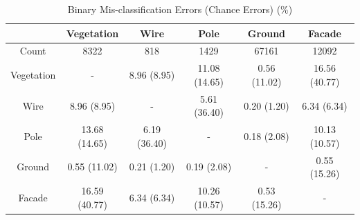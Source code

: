 \documentclass{article}
\begin{document}
\begin{table}
	\centering
	\caption{Binary Mis-classification Errors (Chance Errors) (\%)} 
	\begin{tabular}{cccccc}\toprule
		&Vegetation&Wire&Pole&Ground&Facade\\ \midrule
		Count & 8322 & 818 & 1429 & 67161 & 12092 \\ \midrule
		Vegetation & - & 8.96 (8.95) & 11.08 (14.65) & 0.56 (11.02) & 16.56 (40.77)\\
		Wire & 8.96 (8.95) & - & 5.61 (36.40) & 0.20 (1.20) & 6.34 (6.34) \\
		Pole & 13.68 (14.65) & 6.19 (36.40) & - & 0.18 (2.08) & 10.13 (10.57) \\
		Ground & 0.55 (11.02) & 0.21 (1.20) & 0.19 (2.08) & - & 0.55 (15.26) \\
		Facade & 16.59 (40.77) & 6.34 (6.34) & 10.26 (10.57) & 0.53 (15.26) & - \\ \bottomrule
	\end{tabular}
	\label{onlinesvm}
\end{table}
\end{document}
